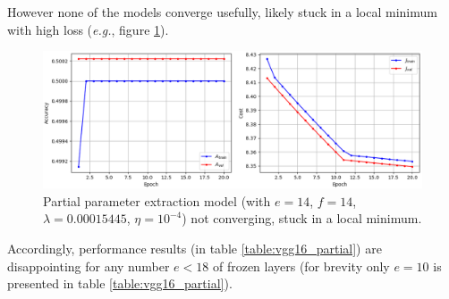 However none of the models converge usefully, likely stuck in a local minimum with high loss (\textit{e.g.}, figure \ref{fig:vgg16_partial_divergence}).

\begin{figure}[ht]
    \centering
    \includegraphics[width=1.0\textwidth]{figs/vgg16_partial_divergence.png}
    \caption{Partial parameter extraction model (with $e = 14$, $f = 14$, $\lambda = 0.00015445$, $\eta = 10^{-4}$) not converging, stuck in a local minimum.}
    \label{fig:vgg16_partial_divergence}
\end{figure}

Accordingly, performance results (in table \ref{table:vgg16_partial}) are disappointing for any number $e < 18$ of frozen layers (for brevity only $e = 10$ is presented in table \ref{table:vgg16_partial}).

